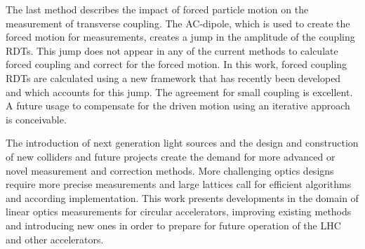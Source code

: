 The last method describes the impact of forced particle motion on the measurement of transverse coupling.
The AC-dipole, which is used to create the forced motion for measurements, creates a jump in the amplitude of the
coupling RDTs. This jump does not appear in any of the current methods to calculate forced coupling and correct for
the forced motion.
In this work, forced coupling RDTs are calculated using a new framework that has recently been developed and which
accounts for this jump. The agreement for small coupling is excellent.
A future usage to compensate for the driven motion using an iterative approach is conceivable.

The introduction of next generation light sources and the design and construction of new colliders and future projects
create the demand for more advanced or novel measurement and correction methods.
More challenging optics designs require more precise measurements and large lattices call for efficient algorithms and
according implementation.
This work presents developments in the domain of linear optics measurements for circular accelerators,
improving existing methods and introducing new ones in order to prepare for future operation of the LHC and other accelerators.